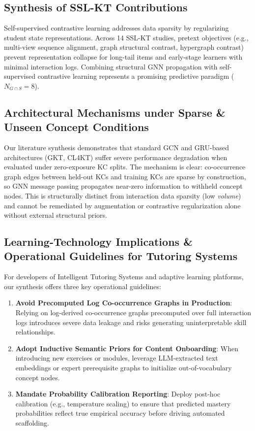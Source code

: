 \documentclass[journal]{IEEEtran}
\begin{document}
\subsection{Synthesis of SSL-KT Contributions}
Self-supervised contrastive learning addresses data sparsity by regularizing student state representations. Across 14 SSL-KT studies, pretext objectives (e.g., multi-view sequence alignment, graph structural contrast, hypergraph contrast) prevent representation collapse for long-tail items and early-stage learners with minimal interaction logs. Combining structural GNN propagation with self-supervised contrastive learning represents a promising predictive paradigm ($N_{G \cap S} = 8$).

\subsection{Architectural Mechanisms under Sparse \& Unseen Concept Conditions}
Our literature synthesis demonstrates that standard GCN and GRU-based architectures (GKT, CL4KT) suffer severe performance degradation when evaluated under zero-exposure KC splits. The mechanism is clear: co-occurrence graph edges between held-out KCs and training KCs are sparse by construction, so GNN message passing propagates near-zero information to withheld concept nodes. This is structurally distinct from interaction data sparsity (low \emph{volume}) and cannot be remediated by augmentation or contrastive regularization alone without external structural priors.

\subsection{Learning-Technology Implications \& Operational Guidelines for Tutoring Systems}
For developers of Intelligent Tutoring Systems and adaptive learning platforms, our synthesis offers three key operational guidelines:
\begin{enumerate}
    \item \textbf{Avoid Precomputed Log Co-occurrence Graphs in Production}: Relying on log-derived co-occurrence graphs precomputed over full interaction logs introduces severe data leakage and risks generating uninterpretable skill relationships.
    \item \textbf{Adopt Inductive Semantic Priors for Content Onboarding}: When introducing new exercises or modules, leverage LLM-extracted text embeddings or expert prerequisite graphs to initialize out-of-vocabulary concept nodes.
    \item \textbf{Mandate Probability Calibration Reporting}: Deploy post-hoc calibration (e.g., temperature scaling) to ensure that predicted mastery probabilities reflect true empirical accuracy before driving automated scaffolding.
\end{enumerate}
\end{document}
